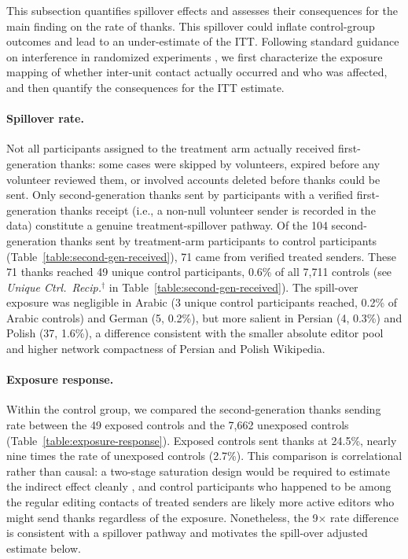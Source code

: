 \documentclass[9pt,twoside,lineno]{pnas-new}
\begin{document}
This subsection quantifies spillover effects and assesses their consequences for the main finding on the rate of thanks. This spillover could inflate control-group outcomes and lead to an under-estimate of the ITT. Following standard guidance on interference in randomized experiments \cite{gerber_field_2012}, we first characterize the exposure mapping of whether inter-unit contact actually occurred and who was affected, and then quantify the consequences for the ITT estimate.

\paragraph{Spillover rate.} Not all participants assigned to the treatment arm actually received first-generation thanks: some cases were skipped by volunteers, expired before any volunteer reviewed them, or involved accounts deleted before thanks could be sent. Only second-generation thanks sent by participants with a verified first-generation thanks receipt (i.e., a non-null volunteer sender is recorded in the data) constitute a genuine treatment-spillover pathway. Of the 104 second-generation thanks sent by treatment-arm participants to control participants (Table~\ref{table:second-gen-received}), 71 came from verified treated senders. These 71 thanks reached 49 unique control participants, 0.6\% of all 7{,}711 controls (see \textit{Unique Ctrl.\ Recip.}$^\dagger$ in Table~\ref{table:second-gen-received}). The spill-over exposure was negligible in Arabic (3 unique control participants reached, 0.2\% of Arabic controls) and German (5, 0.2\%), but more salient in Persian (4, 0.3\%) and Polish (37, 1.6\%), a difference consistent with the smaller absolute editor pool and higher network compactness of Persian and Polish Wikipedia.


\paragraph{Exposure response.} Within the control group, we compared the second-generation thanks sending rate between the 49 exposed controls and the 7{,}662 unexposed controls (Table~\ref{table:exposure-response}). Exposed controls sent thanks at 24.5\%, nearly nine times the rate of unexposed controls (2.7\%). This comparison is correlational rather than causal: a two-stage saturation design would be required to estimate the indirect effect cleanly \cite{gerber_field_2012}, and control participants who happened to be among the regular editing contacts of treated senders are likely more active editors who might send thanks regardless of the exposure. Nonetheless, the 9$\times$ rate difference is consistent with a spillover pathway and motivates the spill-over adjusted estimate below.
\end{document}
